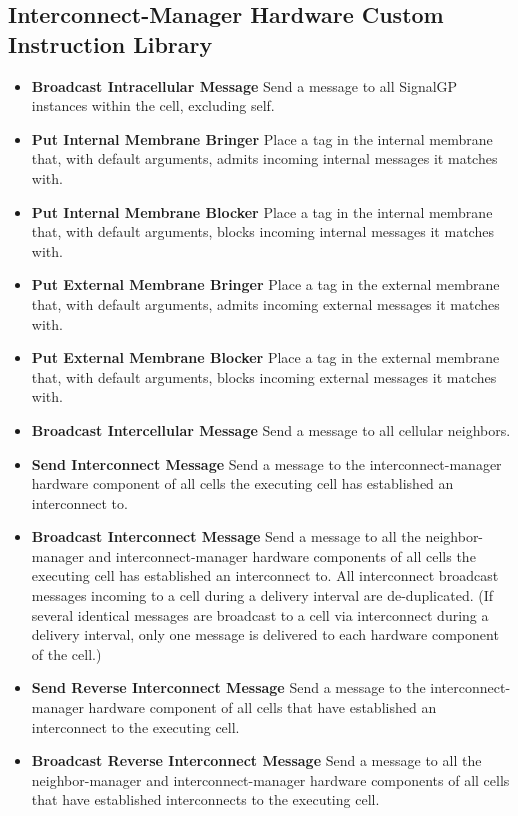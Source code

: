 \subsection{Interconnect-Manager Hardware Custom Instruction Library}

\begin{itemize}
\item \textbf{Broadcast Intracellular Message}
Send a message to all SignalGP instances within the cell, excluding self.
\item \textbf{Put Internal Membrane Bringer}
Place a tag in the internal membrane that, with default arguments, admits incoming internal messages it matches with.
\item \textbf{Put Internal Membrane Blocker}
Place a tag in the internal membrane that, with default arguments, blocks incoming internal messages it matches with.
\item \textbf{Put External Membrane Bringer}
Place a tag in the external membrane that, with default arguments, admits incoming external messages it matches with.
\item \textbf{Put External Membrane Blocker}
Place a tag in the external membrane that, with default arguments, blocks incoming external messages it matches with.
\item \textbf{Broadcast Intercellular Message}
Send a message to all cellular neighbors.
\item \textbf{Send Interconnect Message}
Send a message to the interconnect-manager hardware component of all cells the executing cell has established an interconnect to.
\item \textbf{Broadcast Interconnect Message}
Send a message to all the neighbor-manager and interconnect-manager hardware components of all cells the executing cell has established an interconnect to.
All interconnect broadcast messages incoming to a cell during a delivery interval are de-duplicated.
(If several identical messages are broadcast to a cell via interconnect during a delivery interval, only one message is delivered to each hardware component of the cell.)
\item \textbf{Send Reverse Interconnect Message}
Send a message to the interconnect-manager hardware component of all cells that have established an interconnect to the executing cell.
\item \textbf{Broadcast Reverse Interconnect Message}
Send a message to all the neighbor-manager and interconnect-manager hardware components of all cells that have established interconnects to the executing cell.

\end{itemize}
